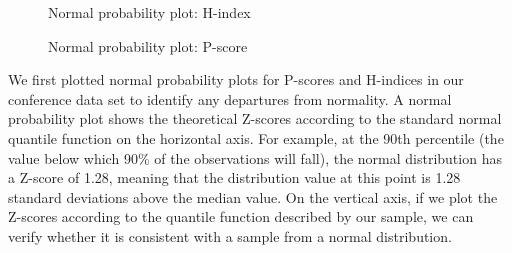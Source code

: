\documentclass[notitlepage]{svjour3}
\begin{document}
\begin{figure}[h]
\centering
    \caption{Normal probability plot: H-index}
    \label{fig:hindex_normality}
\end{figure}

\begin{figure}[h]
\centering
    \caption{Normal probability plot: P-score}
    \label{fig:pscore_normality}
\end{figure}

We first plotted normal probability plots for P-scores and H-indices in our conference data set 
to identify any departures from normality. A normal probability plot shows the theoretical Z-scores
according to the standard normal quantile function on the horizontal axis. For example, at the 90th
percentile (the value below which 90\% of the observations will fall), the normal distribution has a
Z-score of 1.28, meaning that the distribution value at this point is 1.28 standard deviations above the median value. On the vertical axis, if
we plot the Z-scores according to the quantile function described by our sample, we can verify
whether it is consistent with a sample from a normal distribution.
\end{document}
